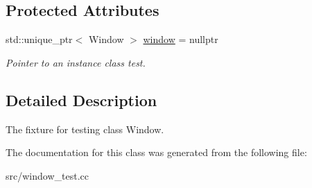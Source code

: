 \subsection*{Protected Attributes}
\begin{DoxyCompactItemize}
\item 
\hypertarget{class_window_test_a8c67ca4e0a784fc94b90c24a0d65ab82}{}\label{class_window_test_a8c67ca4e0a784fc94b90c24a0d65ab82} 
std\+::unique\+\_\+ptr$<$ Window $>$ \hyperlink{class_window_test_a8c67ca4e0a784fc94b90c24a0d65ab82}{window} = nullptr
\begin{DoxyCompactList}\small\item\em Pointer to an instance class test. \end{DoxyCompactList}\end{DoxyCompactItemize}


\subsection{Detailed Description}
The fixture for testing class Window. 

The documentation for this class was generated from the following file\+:\begin{DoxyCompactItemize}
\item 
src/window\+\_\+test.\+cc\end{DoxyCompactItemize}
